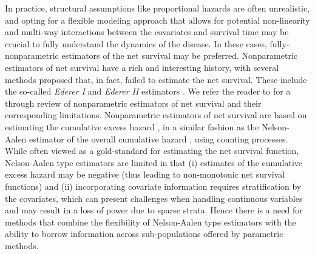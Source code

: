 \documentclass[12pt]{article}
\newcommand{\tony}[1]{\textcolor{blue!60}{\textbf{#1}}}
\begin{document}
In practice, structural assumptions like proportional hazards are often unrealistic, and opting for a flexible modeling approach that allows for potential non-linearity and multi-way interactions between the covariates and survival time may be crucial to fully understand the dynamics of the disease. In these cases, fully-nonparametric estimators of the net survival may be preferred. Nonparametric estimators of net survival have a rich and interesting history, with several methods proposed that, in fact, failed to estimate the net survival. These include the so-called \textit{Ederer I} and \textit{Ederer II} estimators \citep{ederer:1961}. We refer the reader to \cite{perme:2012} for a through review of nonparametric estimators of net survival and their corresponding limitations. Nonparametric estimators of net survival are based on estimating the cumulative excess hazard \citep{perme:2012}, in a similar fashion as the Nelson-Aalen estimator of the overall cumulative hazard \citep{aalen:1978}, using counting processes. While often viewed as a gold-standard for estimating the net survival function, Nelson-Aalen type estimators are limited in that (i) estimates of the cumulative excess hazard may be negative (thus leading to non-monotonic net survival functions) and (ii) incorporating covariate information requires stratification by the covariates, which can present challenges when handling continuous variables and may result in a loss of power due to sparse strata. Hence there is a need for methods that combine the flexibility of Nelson-Aalen type estimators with the ability to borrow information across sub-populations offered by parametric methods.

 
\end{document}

